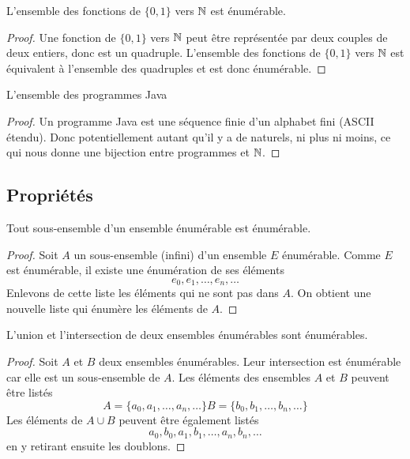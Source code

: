 \begin{myexem}
 L'ensemble des fonctions de  $\{0, 1\}$ vers $\mathbb{N}$ est énumérable.
 \begin{proof}
  Une fonction de $\{0, 1\}$ vers $\mathbb{N}$ peut être représentée par deux couples de deux entiers, donc est un quadruple. L'ensemble des fonctions de $\{0, 1\}$ vers $\mathbb{N}$ est équivalent à l'ensemble des quadruples et est donc énumérable.
 \end{proof}
\end{myexem}
 
 \begin{myexem}
  L'ensemble des programmes Java
  \begin{proof}
   Un programme Java est une séquence finie d'un alphabet fini (ASCII étendu). Donc potentiellement autant qu'il y a de naturels, ni plus ni moins, ce qui nous donne une bijection entre programmes et $\mathbb{N}$. 
  \end{proof}
\end{myexem}

\subsection{Propriétés}
\label{subsec:proprietes}

\begin{myprop}
	Tout sous-ensemble d'un ensemble énumérable est énumérable.
	\begin{proof}
Soit $A$ un sous-ensemble (infini) d'un ensemble $E$ énumérable.  Comme $E$ est énumérable, il existe une énumération de ses éléments
\[
e_0, e_1, \ldots , e_n, \ldots
\]
Enlevons de cette liste les éléments qui ne sont pas dans $A$.  On obtient une nouvelle liste qui énumère les éléments de $A$.
	\end{proof}
\end{myprop}

\begin{myprop}
	L'union et l'intersection de deux ensembles énumérables sont énumérables.
	\begin{proof}
		Soit $A$ et $B$ deux ensembles énumérables.  Leur intersection est énumérable car elle est un sous-ensemble de $A$.   Les éléments des ensembles $A$ et $B$ peuvent être listés
\[
A = \{ a_0, a_1, \ldots , a_n, \ldots\}  
B = \{ b_0, b_1, \ldots , b_n, \ldots\} 
\]
Les éléments de $A \cup B$ peuvent être également listés 
\[
a_0, b_0, a_1, b_1, \ldots, a_n, b_n, \ldots
\]
en y retirant ensuite les doublons.
	\end{proof}
\end{myprop}

